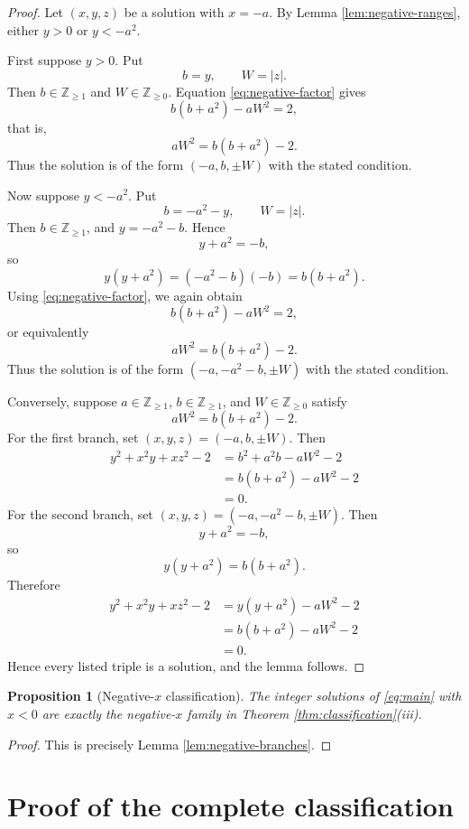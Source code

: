 \documentclass[11pt]{article}
\newtheorem{proposition}[theorem]{Proposition}
\theoremstyle{remark}
\newcommand{\Zge}{\mathbb Z_{\ge 0}}
\newcommand{\Zpos}{\mathbb Z_{\ge 1}}
\begin{document}
\begin{proof}
Let $(x,y,z)$ be a solution with $x=-a$.  By Lemma \ref{lem:negative-ranges}, either $y>0$ or $y<-a^2$.

First suppose $y>0$.  Put
\[
        b=y,
        \qquad W=|z|.
\]
Then $b\in\Zpos$ and $W\in\Zge$.  Equation \eqref{eq:negative-factor} gives
\[
        b(b+a^2)-aW^2=2,
\]
that is,
\[
        aW^2=b(b+a^2)-2.
\]
Thus the solution is of the form $(-a,b,\pm W)$ with the stated condition.

Now suppose $y<-a^2$.  Put
\[
        b=-a^2-y,
        \qquad W=|z|.
\]
Then $b\in\Zpos$, and $y=-a^2-b$.  Hence
\[
        y+a^2=-b,
\]
so
\[
        y(y+a^2)=(-a^2-b)(-b)=b(b+a^2).
\]
Using \eqref{eq:negative-factor}, we again obtain
\[
        b(b+a^2)-aW^2=2,
\]
or equivalently
\[
        aW^2=b(b+a^2)-2.
\]
Thus the solution is of the form $(-a,-a^2-b,\pm W)$ with the stated condition.

Conversely, suppose $a\in\Zpos$, $b\in\Zpos$, and $W\in\Zge$ satisfy
\[
        aW^2=b(b+a^2)-2.
\]
For the first branch, set $(x,y,z)=(-a,b,\pm W)$.  Then
\[
\begin{aligned}
        y^2+x^2y+xz^2-2
        &=b^2+a^2b-aW^2-2 \\
        &=b(b+a^2)-aW^2-2 \\
        &=0.
\end{aligned}
\]
For the second branch, set $(x,y,z)=(-a,-a^2-b,\pm W)$.  Then
\[
        y+a^2=-b,
\]
so
\[
        y(y+a^2)=b(b+a^2).
\]
Therefore
\[
\begin{aligned}
        y^2+x^2y+xz^2-2
        &=y(y+a^2)-aW^2-2 \\
        &=b(b+a^2)-aW^2-2 \\
        &=0.
\end{aligned}
\]
Hence every listed triple is a solution, and the lemma follows.
\end{proof}

\begin{proposition}[Negative-$x$ classification]\label{prop:negative-classification}
The integer solutions of \eqref{eq:main} with $x<0$ are exactly the negative-$x$ family in Theorem \ref{thm:classification}\textnormal{(iii)}.
\end{proposition}

\begin{proof}
This is precisely Lemma \ref{lem:negative-branches}.
\end{proof}

\section{Proof of the complete classification}
\end{document}
